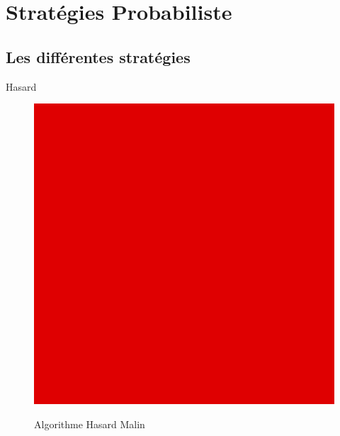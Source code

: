 \section{Stratégies Probabiliste}

\subsection{Les différentes stratégies}
	
	\begin{frame}{Hasard}
		\begin{figure}
		    \centering
		    \includegraphics[width=.5\linewidth]{images/TODO.png}
		    \caption{Algorithme Hasard Malin}
		    \label*{fig:algoHasardMalin}
		\end{figure}{}
	\end{frame}
	

